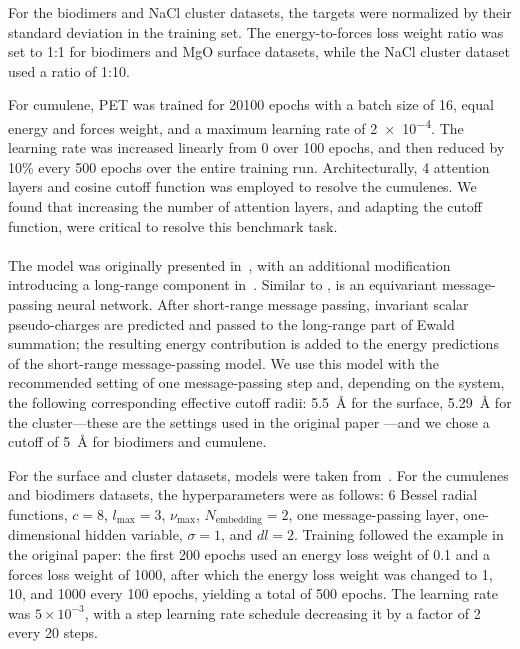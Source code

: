 \documentclass[10pt]{article} %
\begin{document}
For the biodimers and NaCl cluster datasets, the targets were normalized by their standard deviation in the training set. The energy-to-forces loss weight ratio was set to 1:1 for biodimers and MgO surface datasets, while the NaCl cluster dataset used a ratio of 1:10.

For cumulene, PET was trained for \num{20100} epochs with a batch size of \num{16}, equal energy and forces weight, and a maximum learning rate of \num{2e-4}. The learning rate was increased linearly from \num{0} over 100 epochs, and then reduced by 10\% every 500 epochs over the entire training run. Architecturally, \num{4} attention layers and cosine cutoff function was employed to resolve the cumulenes. We found that increasing the number of attention layers, and adapting the cutoff function, were critical to resolve this benchmark task.

\paragraph{\cace}
The \cace model was originally presented in~\cite{c2024}, with an additional modification introducing a long-range component in~\cite{c2025}. Similar to \mace, \cace is an equivariant message-passing neural network. After short-range message passing, invariant scalar pseudo-charges are predicted and passed to the long-range part of Ewald summation; the resulting energy contribution is added to the energy predictions of the short-range message-passing model. We use this model with the recommended setting of one message-passing step and, depending on the system, the following corresponding effective cutoff radii: \qty{5.5}{\angstrom} for the  surface, \qty{5.29}{\angstrom} for the  cluster—these are the settings used in the original paper \cite{kkzc2024}—and we chose a cutoff of \qty{5}{\angstrom} for biodimers and cumulene.

For the  surface and  cluster datasets, models were taken from~\cite{kkzc2024}. For the cumulenes and biodimers datasets, the hyperparameters were as follows: 6 Bessel radial functions, $c = 8$, $l_{\text{max}} = 3$, $\nu_{\text{max}}$, $N_{\text{embedding}} = 2$, one message-passing layer, one-dimensional hidden variable, $\sigma = 1$, and $dl = 2$. Training followed the example in the original paper: the first 200 epochs used an energy loss weight of 0.1 and a forces loss weight of 1000, after which the energy loss weight was changed to 1, 10, and 1000 every 100 epochs, yielding a total of 500 epochs. The learning rate was $5 \times 10^{-3}$, with a step learning rate schedule decreasing it by a factor of 2 every 20 steps.
\end{document}
